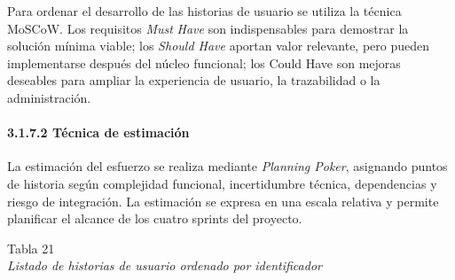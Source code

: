 \documentclass[12pt,a4paper,oneside]{report}
\begin{document}
Para ordenar el desarrollo de las historias de usuario se utiliza la
técnica MoSCoW. Los requisitos \emph{Must} \emph{Have} son
indispensables para demostrar la solución mínima viable; los
\emph{Should Have} aportan valor relevante, pero pueden implementarse
después del núcleo funcional; los Could Have son mejoras deseables para
ampliar la experiencia de usuario, la trazabilidad o la administración.

\paragraph{3.1.7.2 Técnica de
estimación}\label{tuxe9cnica-de-estimaciuxf3n}

La estimación del esfuerzo se realiza mediante \emph{Planning Poker},
asignando puntos de historia según complejidad funcional, incertidumbre
técnica, dependencias y riesgo de integración. La estimación se expresa
en una escala relativa y permite planificar el alcance de los cuatro
sprints del proyecto.

\label{_Toc231672276}{}Tabla 21\\
\emph{Listado de historias de usuario ordenado por identificador}
\end{document}
